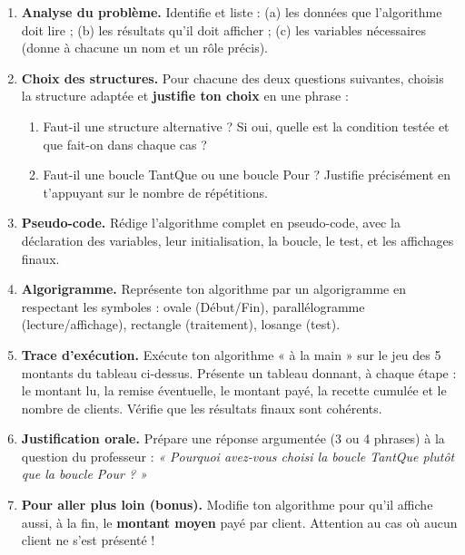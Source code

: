 \documentclass[11pt]{article}
\newcounter{popsec}
\newcounter{popsub}
\newcommand{\courssub}[1]{%
  \stepcounter{popsub}%
  \par\vspace{9pt}\noindent{\popxbold\fontsize{11.5}{13}\selectfont\color{popink}{\color{poporange}\thepopsec.\thepopsub}\hspace{6pt}#1}\par\nopagebreak\vspace{4pt}
}
\begin{document}
\begin{enumerate}
\item \textbf{Analyse du problème.} Identifie et liste : (a) les données que l'algorithme doit lire ; (b) les résultats qu'il doit afficher ; (c) les variables nécessaires (donne à chacune un nom et un rôle précis).
\item \textbf{Choix des structures.} Pour chacune des deux questions suivantes, choisis la structure adaptée et \textbf{justifie ton choix} en une phrase :
\begin{enumerate}
\item Faut-il une structure alternative ? Si oui, quelle est la condition testée et que fait-on dans chaque cas ?
\item Faut-il une boucle TantQue ou une boucle Pour ? Justifie précisément en t'appuyant sur le nombre de répétitions.
\end{enumerate}
\item \textbf{Pseudo-code.} Rédige l'algorithme complet en pseudo-code, avec la déclaration des variables, leur initialisation, la boucle, le test, et les affichages finaux.
\item \textbf{Algorigramme.} Représente ton algorithme par un algorigramme en respectant les symboles : ovale (Début/Fin), parallélogramme (lecture/affichage), rectangle (traitement), losange (test).
\item \textbf{Trace d'exécution.} Exécute ton algorithme « à la main » sur le jeu des 5 montants du tableau ci-dessus. Présente un tableau donnant, à chaque étape : le montant lu, la remise éventuelle, le montant payé, la recette cumulée et le nombre de clients. Vérifie que les résultats finaux sont cohérents.
\item \textbf{Justification orale.} Prépare une réponse argumentée (3 ou 4 phrases) à la question du professeur : \emph{« Pourquoi avez-vous choisi la boucle TantQue plutôt que la boucle Pour ? »}
\item \textbf{Pour aller plus loin (bonus).} Modifie ton algorithme pour qu'il affiche aussi, à la fin, le \textbf{montant moyen} payé par client. Attention au cas où aucun client ne s'est présenté !
\end{enumerate}

\courssub{Ressources à mobiliser}
\end{document}
